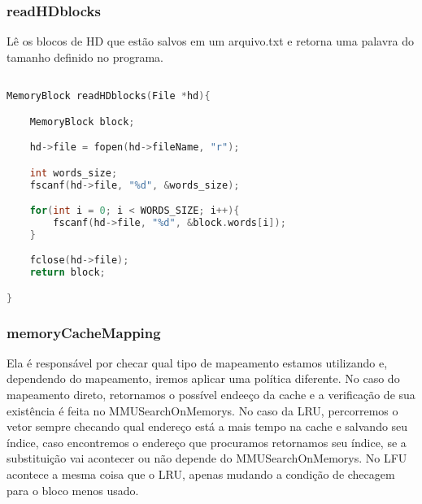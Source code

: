 \documentclass{article}
\begin{document}
\subsubsection{readHDblocks}

Lê os blocos de HD que estão salvos em um arquivo.txt e retorna uma palavra do tamanho definido no programa.

\begin{lstlisting}[caption={startCache},label={lst:cod6},language=C]

MemoryBlock readHDblocks(File *hd){

    MemoryBlock block;

    hd->file = fopen(hd->fileName, "r");

    int words_size;
    fscanf(hd->file, "%d", &words_size);

    for(int i = 0; i < WORDS_SIZE; i++){
        fscanf(hd->file, "%d", &block.words[i]);
    }

    fclose(hd->file);
    return block;

}

\end{lstlisting}

\subsubsection{memoryCacheMapping}

Ela é responsável por checar qual tipo de mapeamento estamos utilizando e, dependendo do mapeamento,
iremos aplicar uma política diferente. No caso do mapeamento direto, retornamos o possível endeeço da cache e a verificação
de sua existência é feita no MMUSearchOnMemorys. No caso da LRU, percorremos o vetor sempre checando qual endereço está a mais tempo na cache
e salvando seu índice, caso encontremos o endereço que procuramos retornamos seu índice, se a substituição vai acontecer ou não depende do MMUSearchOnMemorys.
No LFU acontece a mesma coisa que o LRU, apenas mudando a condição de checagem para o bloco menos usado. 
\end{document}
